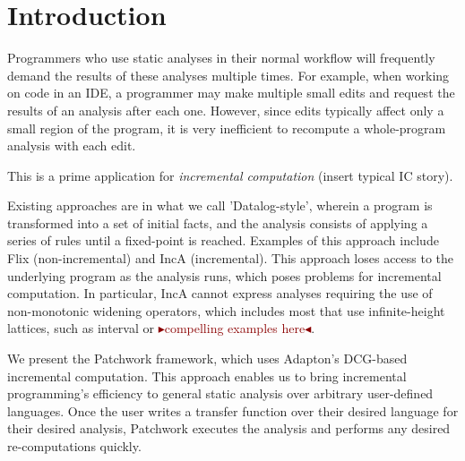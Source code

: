 \documentclass[acmlarge,anonymous]{acmart}\settopmatter{printfolios=true}
\newcommand{\remark}[1]{\textcolor{darkred}{$\blacktriangleright$#1$\blacktriangleleft$}}
\begin{document}




\maketitle


\section{Introduction}

Programmers who use static analyses in their normal workflow will frequently demand the results of these analyses multiple times.
For example, when working on code in an IDE, a programmer may make multiple small edits and request the results of an analysis after each one.
However, since edits typically affect only a small region of the program, it is very inefficient to recompute a whole-program analysis with each edit.

This is a prime application for \textit{incremental computation} (insert typical IC story). 

Existing approaches are in what we call 'Datalog-style', wherein a program is transformed into a set of initial facts, and the analysis consists of applying a series of rules until a fixed-point is reached. Examples of this approach include Flix (non-incremental) and IncA (incremental). This approach loses access to the underlying program as the analysis runs, which poses problems for incremental computation. In particular, IncA cannot express analyses requiring the use of non-monotonic widening operators, which includes most that use infinite-height lattices, such as interval or \remark{compelling examples here}.

We present the Patchwork framework, which uses Adapton's DCG-based incremental computation. This approach enables us to bring incremental programming's efficiency to general static analysis over arbitrary user-defined languages. Once the user writes a transfer function over their desired language for their desired analysis, Patchwork executes the analysis and performs any desired re-computations quickly.
\end{document}
